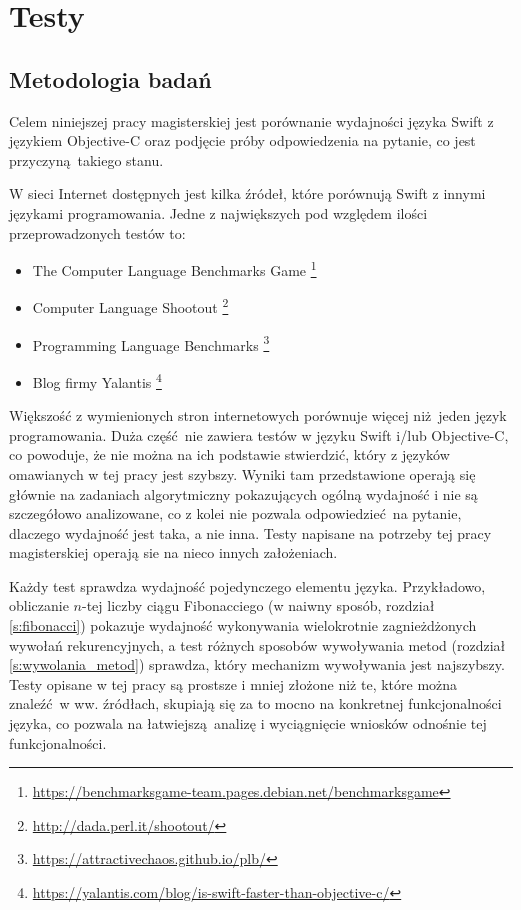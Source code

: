 \documentclass[mgr, shortabstract]{iithesis}
\begin{document}
\chapter{Testy}
\label{ch:testy}

\section{Metodologia badań}

Celem niniejszej pracy magisterskiej jest porównanie wydajności języka Swift z językiem Objective-C oraz podjęcie próby odpowiedzenia na pytanie, co jest przyczyną takiego stanu.

W sieci Internet dostępnych jest kilka źródeł, które porównują Swift z innymi językami programowania. Jedne z największych pod względem ilości przeprowadzonych testów to:
\begin{itemize}
    \item The Computer Language Benchmarks Game \footnote{\url{https://benchmarksgame-team.pages.debian.net/benchmarksgame}}
    \item Computer Language Shootout \footnote{\url{http://dada.perl.it/shootout/}}
    \item Programming Language Benchmarks \footnote{\url{https://attractivechaos.github.io/plb/}}
    \item Blog firmy Yalantis \footnote{\url{https://yalantis.com/blog/is-swift-faster-than-objective-c/}}
\end{itemize}

Większość z wymienionych stron internetowych porównuje więcej niż jeden język programowania. Duża część nie zawiera testów w języku Swift i/lub Objective-C, co powoduje, że nie można na ich podstawie stwierdzić, który z języków omawianych w tej pracy jest szybszy. Wyniki tam przedstawione operają się głównie na zadaniach algorytmiczny pokazujących ogólną wydajność i nie są szczegółowo analizowane, co z kolei nie pozwala odpowiedzieć na pytanie, dlaczego wydajność jest taka, a nie inna. Testy napisane na potrzeby tej pracy magisterskiej operają sie na nieco innych założeniach. 

Każdy test sprawdza wydajność pojedynczego elementu języka. Przykładowo, obliczanie $n$-tej liczby ciągu Fibonacciego (w naiwny sposób, rozdział \ref{s:fibonacci}) pokazuje wydajność wykonywania wielokrotnie zagnieżdżonych wywołań rekurencyjnych, a test różnych sposobów wywoływania metod (rozdział \ref{s:wywolania_metod}) sprawdza, który mechanizm wywoływania jest najszybszy. Testy opisane w tej pracy są prostsze i mniej złożone niż te, które można znaleźć w ww. źródłach, skupiają się za to mocno na konkretnej funkcjonalności języka, co pozwala na łatwiejszą analizę i wyciągnięcie wniosków odnośnie tej funkcjonalności.
\end{document}
